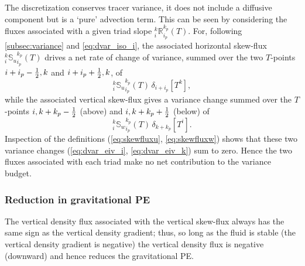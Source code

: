 \documentclass[../main/NEMO_manual]{subfiles}
\begin{document}
The discretization conserves tracer variance, \ie it does not include a diffusive component but is a `pure' advection term.
This can be seen %
by considering the fluxes associated with a given triad slope $_i^k{\mathbb{R}}_{i_p}^{k_p} (T)$.
For, following \autoref{subsec:variance} and \autoref{eq:dvar_iso_i},
the associated horizontal skew-flux $_i^k{\mathbb{S}_u}_{i_p}^{k_p} (T)$ drives a net rate of change of variance,
summed over the two $T$-points $i+i_p-\textstyle \frac{1}{2},k$ and $i+i_p+\textstyle \frac{1}{2},k$, of
\begin{equation}
  \label{eq:dvar_eiv_i}
  _i^k{\mathbb{S}_u}_{i_p}^{k_p} (T)\,\delta_{i+ i_p}[T^k],
\end{equation}
while the associated vertical skew-flux gives a variance change summed over
the $T$-points $i,k+k_p-\textstyle \frac{1}{2}$ (above) and $i,k+k_p+\textstyle \frac{1}{2}$ (below) of
\begin{equation}
  \label{eq:dvar_eiv_k}
  _i^k{\mathbb{S}_w}_{i_p}^{k_p} (T) \,\delta_{k+ k_p}[T^i].
\end{equation}
Inspection of the definitions (\autoref{eq:skewfluxu}, \autoref{eq:skewfluxw}) shows that
these two variance changes (\autoref{eq:dvar_eiv_i}, \autoref{eq:dvar_eiv_k}) sum to zero.
Hence the two fluxes associated with each triad make no net contribution to the variance budget.

\subsubsection{Reduction in gravitational PE}

The vertical density flux associated with the vertical skew-flux always has the same sign as
the vertical density gradient;
thus, so long as the fluid is stable (the vertical density gradient is negative)
the vertical density flux is negative (downward) and hence reduces the gravitational PE.
\end{document}
